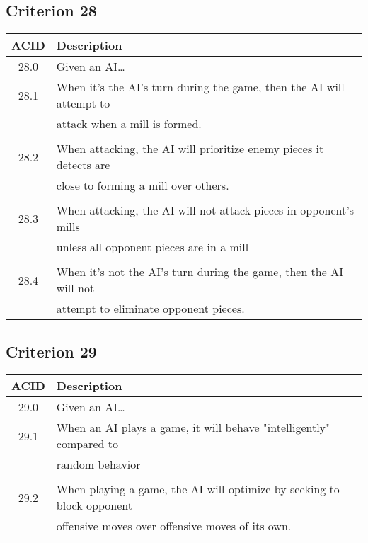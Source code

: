 \documentclass[11pt]{article}
\begin{document}
\subsection{Criterion 28}
\label{sec:orgdd66f50}
\begin{center}
\begin{tabular}{|c|p{12.0cm}|}
ACID & Description\\
\hline
28.0 & Given an AI\ldots{}\\
\hline
28.1 & When it's the AI's turn during the game, then the AI will attempt to\\
 & attack when a mill is formed.\\
 & \\
28.2 & When attacking, the AI will prioritize enemy pieces it detects are\\
 & close to forming a mill over others.\\
 & \\
28.3 & When attacking, the AI will not attack pieces in opponent's mills\\
 & unless all opponent pieces are in a mill\\
 & \\
28.4 & When it's not the AI's turn during the game, then the AI will not\\
 & attempt to eliminate opponent pieces.\\
\end{tabular}
\end{center}

\subsection{Criterion 29}
\label{sec:org1bb595a}
\begin{center}
\begin{tabular}{|c|p{12.0cm}|}
ACID & Description\\
\hline
29.0 & Given an AI\ldots{}\\
\hline
29.1 & When an AI plays a game, it will behave "intelligently" compared to\\
 & random behavior\\
 & \\
29.2 & When playing a game, the AI will optimize by seeking to block opponent\\
 & offensive moves over offensive  moves of its own.\\
\end{tabular}
\end{center}
\end{document}
